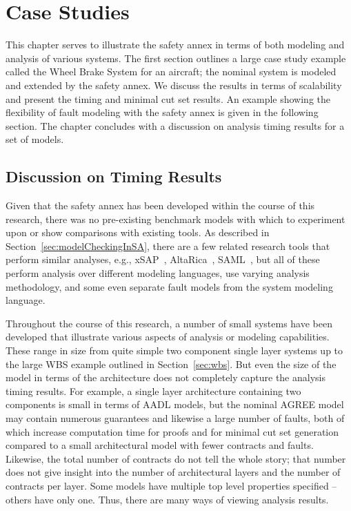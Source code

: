 \chapter{Case Studies}
\label{chap:caseStudies}
This chapter serves to illustrate the safety annex in terms of both modeling and analysis of various systems. The first section outlines a large case study example called the Wheel Brake System for an aircraft; the nominal system is modeled and extended by the safety annex. We discuss the results in terms of scalability and present the timing and minimal cut set results. An example showing the flexibility of fault modeling with the safety annex is given in the following section. The chapter concludes with a discussion on analysis timing results for a set of models. 




\section{Discussion on Timing Results}
Given that the safety annex has been developed within the course of this research, there was no pre-existing benchmark models with which to experiment upon or show comparisons with existing tools. As described in Section~\ref{sec:modelCheckingInSA}, there are a few related research tools that perform similar analyses, e.g., xSAP~\cite{DBLP:conf/tacas/BittnerBCCGGMMZ16}, AltaRica~\cite{signoret1998altarica}, SAML~\cite{Gudemann:2010:FQQ:1909626.1909813}, but all of these perform analysis over different modeling languages, use varying analysis methodology, and some even separate fault models from the system modeling language. 

Throughout the course of this research, a number of small systems have been developed that illustrate various aspects of analysis or modeling capabilities. These range in size from quite simple two component single layer systems up to the large WBS example outlined in Section~\ref{sec:wbs}. But even the size of the model in terms of the architecture does not completely capture the analysis timing results. For example, a single layer architecture containing two components is small in terms of AADL models, but the nominal AGREE model may contain numerous guarantees and likewise a large number of faults, both of which increase computation time for proofs and for minimal cut set generation compared to a small architectural model with fewer contracts and faults. Likewise, the total number of contracts do not tell the whole story; that number does not give insight into the number of architectural layers and the number of contracts per layer. Some models have multiple top level properties specified -- others have only one. Thus, there are many ways of viewing analysis results. 

